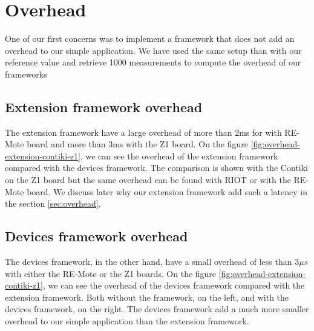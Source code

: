 \section{Overhead}

One of our first concerns was to implement a framework that does not add an overhead to our simple application.
We have used the same setup than with our reference value and retrieve 1000 measurements to compute the overhead of our frameworks

\subsection{Extension framework overhead}

The extension framework have a large overhead of more than 2ms for with RE-Mote board and more than 3ms with the Z1 board.
On the figure \ref{fig:overhead-extension-contiki-z1}, we can see the overhead of the extension framework compared with the devices framework.
The comparison is shown with the Contiki on the Z1 board but the same overhead can be found with RIOT or with the RE-Mote board.
We discuss later why our extension framework add such a latency in the section \ref{sec:overhead}.



\subsection{Devices framework overhead}

The devices framework, in the other hand, have a small overhead of less than $3\mu s$ with either the RE-Mote or the Z1 boards.
On the figure \ref{fig:overhead-extension-contiki-z1}, we can see the overhead of the devices framework compared with the extension framework.
Both without the framework, on the left, and with the devices framework, on the right.
The devices framework add a much more smaller overhead to our simple application than the extension framework. %

